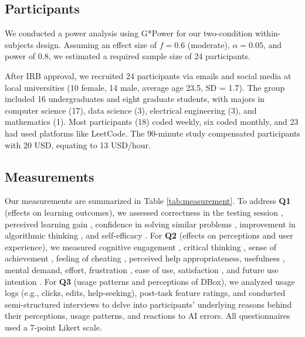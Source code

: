 \subsection{Participants}

We conducted a power analysis using G*Power \cite{faul2009statistical} for our two-condition within-subjects design. Assuming an effect size of $f = 0.6$ (moderate), $\alpha = 0.05$, and power of 0.8, we estimated a required sample size of 24 participants.

After IRB approval, we recruited 24 participants via emails and social media at local universities (10 female, 14 male, average age 23.5, SD = 1.7). The group included 16 undergraduates and eight graduate students, with majors in computer science (17), data science (3), electrical engineering (3), and mathematics (1). Most participants (18) coded weekly, six coded monthly, and 23 had used platforms like LeetCode. The 90-minute study compensated participants with 20 USD, equating to 13 USD/hour.






\subsection{Measurements}
Our measurements are summarized in Table \ref{tab:measurement}. To address \textbf{Q1} (effects on learning outcomes), we assessed correctness in the testing session \cite{kazemitabaar2023studying}, perceived learning gain \cite{zhou2021does}, confidence in solving similar problems \cite{hendriana2018role}, improvement in algorithmic thinking \cite{yaugci2019valid}, and self-efficacy \cite{tsai2019improving, yildiz2018digital}. For \textbf{Q2} (effects on perceptions and user experience), we measured cognitive engagement \cite{pitterson2016measuring}, critical thinking \cite{kamin2001measuring}, sense of achievement \cite{wiedenbeck2004factors}, feeling of cheating \cite{kazemitabaar2023studying}, perceived help appropriateness, usefulness \cite{davis1989perceived}, mental demand, effort, frustration \cite{hart2006nasa}, ease of use, satisfaction \cite{bangor2008empirical}, and future use intention \cite{holden2010technology}. For \textbf{Q3} (usage patterns and perceptions of DBox), we analyzed usage logs (e.g., clicks, edits, help-seeking), post-task feature ratings, and conducted semi-structured interviews to delve into participants' underlying reasons behind their perceptions, usage patterns, and reactions to AI errors. All questionnaires used a 7-point Likert scale.

